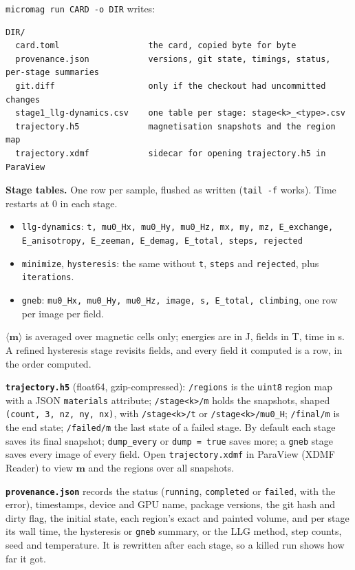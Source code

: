 \documentclass[10pt,a4paper]{article}
\newcommand{\code}[1]{\texttt{#1}}
\newcommand{\vm}{\mathbf{m}}
\begin{document}
\code{micromag run CARD -o DIR} writes:\\
\begin{minipage}{\linewidth}
\begin{lstlisting}
DIR/
  card.toml                  the card, copied byte for byte
  provenance.json            versions, git state, timings, status, per-stage summaries
  git.diff                   only if the checkout had uncommitted changes
  stage1_llg-dynamics.csv    one table per stage: stage<k>_<type>.csv
  trajectory.h5              magnetisation snapshots and the region map
  trajectory.xdmf            sidecar for opening trajectory.h5 in ParaView
\end{lstlisting}
\end{minipage}

\textbf{Stage tables.} One row per sample, flushed as written (\code{tail -f} works). Time restarts at 0 in each stage.
\begin{itemize}
  \item \code{llg-dynamics}: \code{t, mu0\_Hx, mu0\_Hy, mu0\_Hz, mx, my, mz, E\_exchange, E\_anisotropy, E\_zeeman,
        E\_demag, E\_total, steps, rejected}
  \item \code{minimize}, \code{hysteresis}: the same without \code{t}, \code{steps} and \code{rejected}, plus
        \code{iterations}.
  \item \code{gneb}: \code{mu0\_Hx, mu0\_Hy, mu0\_Hz, image, s, E\_total, climbing}, one row per image per field.
\end{itemize}
$\langle\vm\rangle$ is averaged over magnetic cells only; energies are in J, fields in T, time in s. A refined
hysteresis stage revisits fields, and every field it computed is a row, in the order computed.

\textbf{\code{trajectory.h5}} (float64, gzip-compressed):
\code{/regions} is the \code{uint8} region map with a JSON \code{materials} attribute; \code{/stage<k>/m} holds the
snapshots, shaped \code{(count, 3, nz, ny, nx)}, with \code{/stage<k>/t} or \code{/stage<k>/mu0\_H}; \code{/final/m}
is the end state; \code{/failed/m} the last state of a failed stage. By default each stage saves its final snapshot;
\code{dump\_every} or \code{dump = true} saves more; a \code{gneb} stage saves every image of every field. Open \code{trajectory.xdmf} in ParaView (XDMF Reader) to view
$\vm$ and the regions over all snapshots.

\textbf{\code{provenance.json}} records the status (\code{running}, \code{completed} or \code{failed}, with the error),
timestamps, device and GPU name, package versions, the git hash and dirty flag, the initial state, each region's exact
and painted volume, and per stage its wall time, the hysteresis or \code{gneb} summary, or the LLG method, step counts, seed and
temperature. It is rewritten after each stage, so a killed run shows how far it got.
\end{document}
